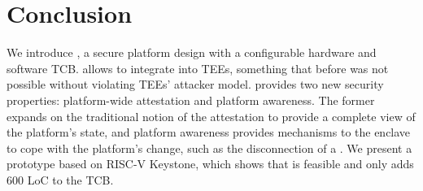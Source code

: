 \section{Conclusion}
\label{sec:conclusion}



We introduce \name, a secure platform design with a configurable hardware and software TCB. \name allows to integrate \sphw into TEEs, something that before was not possible without violating TEEs' attacker model.  
\name provides two new security properties: platform-wide attestation and platform awareness. The former expands on the traditional notion of the attestation to provide a complete view of the platform's state, and platform awareness provides mechanisms to the enclave to cope with the platform's change, such as the disconnection of a \sphw. We present a prototype based on RISC-V Keystone, which shows that \name is feasible and only adds $600$ LoC to the TCB.